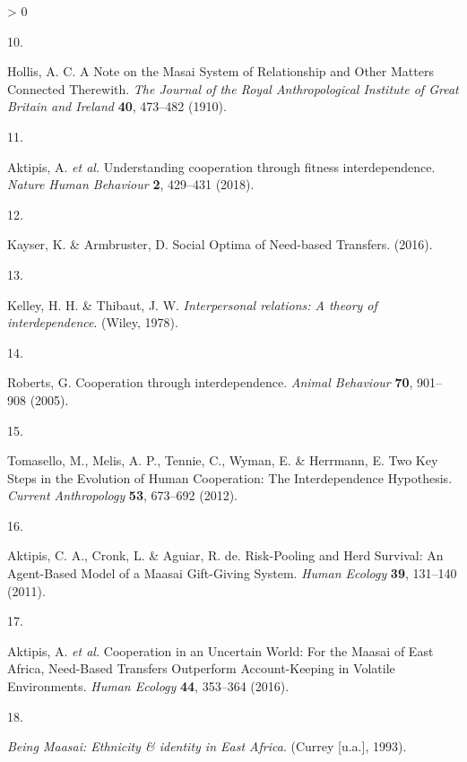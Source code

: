 \documentclass[
]{article}
\newlength{\cslhangindent}
\newlength{\csllabelwidth}
\newenvironment{CSLReferences}[2] %
 {%
  \setlength{\parindent}{0pt}
  \ifodd #1 \everypar{\setlength{\hangindent}{\cslhangindent}}\ignorespaces\fi
  \ifnum #2 > 0
  \setlength{\parskip}{#2\baselineskip}
  \fi
 }%
 {}
\newcommand{\CSLLeftMargin}[1]{\parbox[t]{\csllabelwidth}{#1}}
\newcommand{\CSLRightInline}[1]{\parbox[t]{\linewidth - \csllabelwidth}{#1}\break}
\begin{document}
\begin{CSLReferences}{0}{0}
\leavevmode\hypertarget{ref-hollisNoteMasaiSystem1910}{}%
\CSLLeftMargin{10. }
\CSLRightInline{Hollis, A. C. A {Note} on the {Masai System} of {Relationship} and {Other Matters Connected Therewith}. \emph{The Journal of the Royal Anthropological Institute of Great Britain and Ireland} \textbf{40}, 473--482 (1910).}

\leavevmode\hypertarget{ref-aktipisUnderstandingCooperationFitness2018}{}%
\CSLLeftMargin{11. }
\CSLRightInline{Aktipis, A. \emph{et al.} Understanding cooperation through fitness interdependence. \emph{Nature Human Behaviour} \textbf{2}, 429--431 (2018).}

\leavevmode\hypertarget{ref-kayserSocialOptimaNeedbased2016}{}%
\CSLLeftMargin{12. }
\CSLRightInline{Kayser, K. \& Armbruster, D. Social {Optima} of {Need}-based {Transfers}. (2016).}

\leavevmode\hypertarget{ref-kelleyInterpersonalRelationsTheory1978}{}%
\CSLLeftMargin{13. }
\CSLRightInline{Kelley, H. H. \& Thibaut, J. W. \emph{Interpersonal relations: A theory of interdependence}. ({Wiley}, 1978).}

\leavevmode\hypertarget{ref-robertsCooperationInterdependence2005}{}%
\CSLLeftMargin{14. }
\CSLRightInline{Roberts, G. Cooperation through interdependence. \emph{Animal Behaviour} \textbf{70}, 901--908 (2005).}

\leavevmode\hypertarget{ref-tomaselloTwoKeySteps2012}{}%
\CSLLeftMargin{15. }
\CSLRightInline{Tomasello, M., Melis, A. P., Tennie, C., Wyman, E. \& Herrmann, E. Two {Key Steps} in the {Evolution} of {Human Cooperation}: {The Interdependence Hypothesis}. \emph{Current Anthropology} \textbf{53}, 673--692 (2012).}

\leavevmode\hypertarget{ref-aktipisRiskPoolingHerdSurvival2011}{}%
\CSLLeftMargin{16. }
\CSLRightInline{Aktipis, C. A., Cronk, L. \& Aguiar, R. de. Risk-{Pooling} and {Herd Survival}: {An Agent}-{Based Model} of a {Maasai Gift}-{Giving System}. \emph{Human Ecology} \textbf{39}, 131--140 (2011).}

\leavevmode\hypertarget{ref-aktipisCooperationUncertainWorld2016}{}%
\CSLLeftMargin{17. }
\CSLRightInline{Aktipis, A. \emph{et al.} Cooperation in an {Uncertain World}: {For} the {Maasai} of {East Africa}, {Need}-{Based Transfers Outperform Account}-{Keeping} in {Volatile Environments}. \emph{Human Ecology} \textbf{44}, 353--364 (2016).}

\leavevmode\hypertarget{ref-spearBeingMaasaiEthnicity1993}{}%
\CSLLeftMargin{18. }
\CSLRightInline{\emph{Being {Maasai}: Ethnicity \& identity in {East Africa}}. ({Currey {[}u.a.{]}}, 1993).}


\end{CSLReferences}
\end{document}

